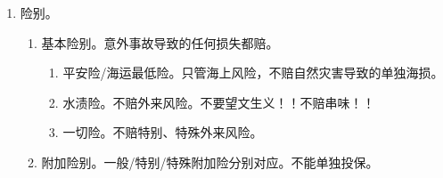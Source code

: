 \begin{enumerate}
\begin{enumerate}
\begin{enumerate}
\begin{kk}{推定全损索赔}
\begin{enumerate}
                            \item 必须向保险公司发出委付通知。我不要了给你。单方意思表示。
                            \item 保险公司在合理的时间内将决定通知投保人，是否接受。
                            \item 合同看标的看标的看标的。委付通知针对标的物残值所有权，和怎么赔、赔多少没关系。
                            \item \hz 按部分损失进行索赔。
                          \end{enumerate}
                        \end{kk}
                \end{enumerate}
          \item 部分损失。
                \begin{enumerate}
                  \item 共同海损。危险危及到了船、有意采取措施（只看主观）导致的、措施相对合理。。
                        \begin{enumerate}
                          \item 有共损必有分摊。由受益方（承运人也有可能是受益方，不要漏了）按各自获救比例分摊。
                          \item 共同海损的分摊叫共同海损理算，适用理算地法。。
                        \end{enumerate}
                  \item 单独海损。个案推定。非“有意”采取措施导致。
                \end{enumerate}
        \end{enumerate}
  \item 险别。
        \begin{enumerate}
          \item 基本险别。意外事故导致的任何损失都赔。
                \begin{enumerate}
                  \item 平安险/海运最低险。只管海上风险，不赔自然灾害导致的单独海损。
                  \item 水渍险。不赔外来风险。不要望文生义！！不赔串味！！
                  \item 一切险。不赔特别、特殊外来风险。
                \end{enumerate}
          \item 附加险别。一般/特别/特殊附加险分别对应。不能单独投保。
        \end{enumerate}

\end{enumerate}

